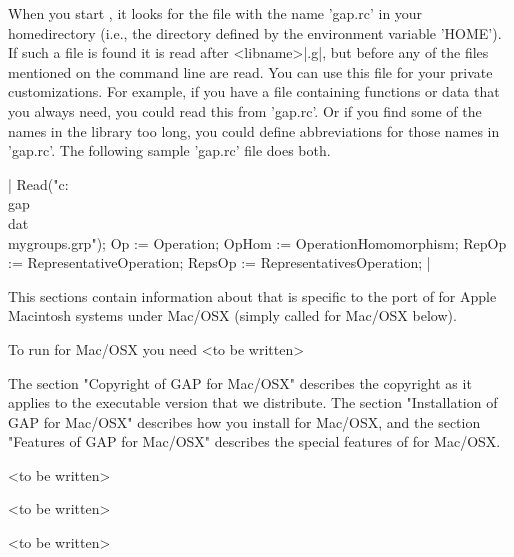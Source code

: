 When you start {\GAP}, it looks  for  the file  with the name 'gap.rc' in
your  homedirectory (i.e., the   directory   defined by  the  environment
variable     'HOME').  If  such   a file  is    found it   is read  after
<libname>|\init.g|, but before any of the  files mentioned on the command
line are read.   You can use  this file for your private  customizations.
For example, if you  have a file  containing  functions  or data that you
always need, you could read this from 'gap.rc'.   Or if you find  some of
the names in  the  library too long,  you could define abbreviations  for
those names in 'gap.rc'.  The following sample 'gap.rc' file does both.

|    Read("c:\\gap\\dat\\mygroups.grp");
    Op := Operation;
    OpHom := OperationHomomorphism;
    RepOp := RepresentativeOperation;
    RepsOp := RepresentativesOperation; |

%

This sections contain  information about {\GAP} that  is specific to  the
port of  {\GAP} for Apple  Macintosh  systems under Mac/OSX (simply  called
{\GAP} for Mac/OSX below).

To run {\GAP} for Mac/OSX you need <to be written>

The  section "Copyright of GAP for  Mac/OSX" describes the  copyright as it
applies  to  the executable  version  that   we distribute.  The  section
"Installation   of GAP for  Mac/OSX" describes  how you  install {\GAP} for
Mac/OSX, and the section "Features of GAP  for Mac/OSX" describes the special
features of {\GAP} for Mac/OSX.

%

<to be written>

%

<to be written>

%

<to be written>


